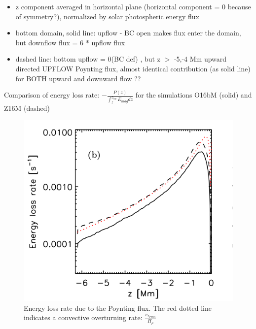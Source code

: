 \documentclass{beamer}
\begin{document}
\begin{frame}

\begin{itemize}
\item z component averaged in horizontal plane (horizontal component = 0 because of symmetry?), 
normalized by solar photospheric energy flux
\item bottom domain, solid line: upflow - BC open makes flux enter the domain, but downflow flux = 6 * upflow flux
\item dashed line: bottom upflow = 0(BC def) , but z $>$ -5,-4 Mm upward directed UPFLOW Poynting flux, 
almost identical contribution (as solid line) for BOTH upward and downward flow ??
\end{itemize}

\end{frame}
\begin{frame}{Comparison of energy loss rate: $-\frac{P(z)}{\int_z^{z_{top}}{E_{mag} dz }}$   for the simulations O16bM (solid) and Z16M (dashed)}

\begin{figure}[H]
 \centering
 \includegraphics[scale=0.3]{poynting2.png}
	\caption{Energy loss rate due to the Poynting flux. The
red dotted line indicates a convective overturning rate: $\frac{{v_z}_{rms}}{H_{\rho}}$}
\end{figure}

\end{frame}
\end{document}
